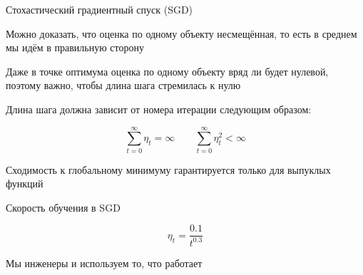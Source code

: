 \documentclass[notes,12pt, aspectratio=169]{beamer}
\newenvironment{wideitemize}{\itemize\addtolength{\itemsep}{10pt}}{\enditemize}
\begin{document}
\begin{frame}{Стохастический градиентный спуск (SGD)}
\begin{wideitemize}
	\item   Можно доказать, что оценка по одному объекту несмещённая, то есть в среднем мы идём в правильную сторону
	
	\item   Даже в точке оптимума оценка по одному объекту вряд ли будет нулевой, поэтому важно, чтобы длина шага стремилась к нулю
	
	\item Длина шага  должна зависит от номера итерации следующим образом:
	
	\[
	\sum_{t=0}^{\infty} \eta_t = \infty \qquad  \sum_{t=0}^{\infty} \eta_t^2 < \infty
	\]
	
	\item   Сходимость к глобальному минимуму гарантируется только для выпуклых функций
\end{wideitemize}
\end{frame}


\begin{frame}{Скорость обучения в SGD} 

\[ 
\eta_t = \frac{0.1}{t^{0.3}}
\]

\begin{center}

\alert{Мы инженеры и используем то, что работает}
\end{center}
\end{frame}
\end{document}
